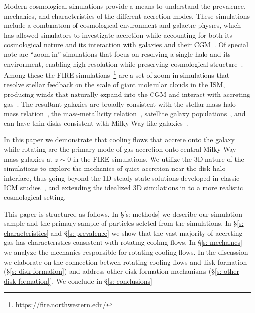 \documentclass[fleqn,usenatbib]{mnras}
\begin{document}
Modern cosmological simulations provide a means to understand the prevalence, mechanics, and characteristics of the different accretion modes.
These simulations include a combination of cosmological environment and galactic physics, which has allowed simulators to investigate accretion while accounting for both its cosmological nature and its interaction with galaxies and their CGM~\citep[e.g.][]{Oppenheimer2010, Stewart2011, Fernandez2012, Ford2014, Angles-Alcazar2017, Hafen2019, Hafen2020, Ho2019, Rottgers2020, Trapp2021}.
Of special note are ``zoom-in'' simulations that focus on resolving a single halo and its environment, enabling high resolution while preserving cosmological structure~\citep[e.g.][]{Katz1993, Hopkins2014, Hopkins2018, Wang2015, Agertz2020}.
Among these the FIRE simulations~\citep{Hopkins2014, Hopkins2017}\footnote{\url{https://fire.northwestern.edu/}} are a set of zoom-in simulations that resolve stellar feedback on the scale of giant molecular clouds in the ISM, producing winds that naturally expand into the CGM and interact with accreting gas~\citep{Muratov2015, Muratov2017, Hafen2019, Hafen2020}.
The resultant galaxies are broadly consistent with the stellar mass-halo mass relation~\citep{Hopkins2017}, the mass-metallicity relation~\citep{Ma2016a}, satellite galaxy populations~\citep{Wetzel2016, Garrison-Kimmel2019a}, and can have thin-disks consistent with Milky Way-like galaxies~\citep{Garrison-Kimmel2018, El-Badry2018}.

In this paper we demonstrate that cooling flows that accrete onto the galaxy while rotating are the primary mode of gas accretion onto central Milky Way-mass galaxies at $z \sim 0$ in the FIRE simulations. 
We utilize the 3D nature of the simulations to explore the mechanics of quiet accretion near the disk-halo interface, thus going beyond the 1D steady-state solutions developed in classic ICM studies~\citep[e.g.][]{Cowie1980}, and extending the idealized 3D simulations in \cite{Stern2020} to a more realistic cosmological setting. 

This paper is structured as follows. 
In \S\ref{s: methods} we describe our simulation sample and the primary sample of particles selcted from the simulations.
In \S\ref{s: characteristics} and \S\ref{s: prevalence} we show that the vast majority of accreting gas has characteristics consistent with rotating cooling flows.
In \S\ref{s: mechanics} we analyze the mechanics responsible for rotating cooling flows.
In the discussion we elaborate on the connection betwen rotating cooling flows and disk formation (\S\ref{s: disk formation}) and address other disk formation mechanisms (\S\ref{s: other disk formation}).
We conclude in \S\ref{s: conclusions}.
\end{document}

